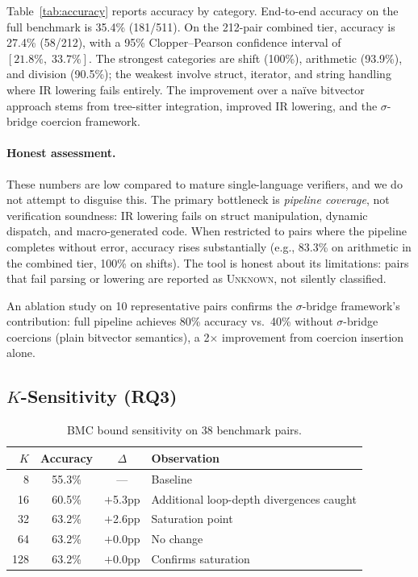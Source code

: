 \documentclass[10pt,a4paper]{article}
\begin{document}
Table~\ref{tab:accuracy} reports accuracy by category.  End-to-end
accuracy on the full benchmark is 35.4\% (181/511).
On the 212-pair combined tier, accuracy is 27.4\% (58/212),
with a 95\% Clopper--Pearson confidence interval of
$[21.8\%,\; 33.7\%]$.
The strongest categories are shift (100\%), arithmetic (93.9\%),
and division (90.5\%); the weakest involve struct, iterator, and
string handling where IR lowering fails entirely.  The improvement
over a na\"ive bitvector approach stems from tree-sitter
integration, improved IR lowering, and the $\sigma$-bridge coercion
framework.

\paragraph{Honest assessment.}
These numbers are low compared to mature single-language verifiers,
and we do not attempt to disguise this.  The primary bottleneck is
\emph{pipeline coverage}, not verification soundness: IR lowering fails on struct
manipulation, dynamic dispatch, and macro-generated code.  When
restricted to pairs where the pipeline completes without error,
accuracy rises substantially (e.g., 83.3\% on arithmetic in the
combined tier, 100\% on shifts).  The tool is honest about its
limitations: pairs that fail parsing or lowering are reported as
\textsc{Unknown}, not silently classified.

An ablation study on 10 representative pairs confirms the
$\sigma$-bridge framework's contribution: full pipeline achieves
80\% accuracy vs.\ 40\% without $\sigma$-bridge coercions (plain
bitvector semantics), a 2$\times$ improvement from coercion
insertion alone.

\subsection{$K$-Sensitivity (RQ3)}\label{sec:eval-k}

\begin{table}[t]
\centering
\small
\caption{BMC bound sensitivity on 38 benchmark pairs.}
\label{tab:k-sensitivity}
\begin{tabular}{@{}rccl@{}}
\toprule
$K$ & Accuracy & $\Delta$ & Observation \\
\midrule
8   & 55.3\% & ---       & Baseline \\
16  & 60.5\% & $+$5.3pp  & Additional loop-depth divergences caught \\
32  & 63.2\% & $+$2.6pp  & Saturation point \\
64  & 63.2\% & $+$0.0pp  & No change \\
128 & 63.2\% & $+$0.0pp  & Confirms saturation \\
\bottomrule
\end{tabular}
\end{table}
\end{document}
